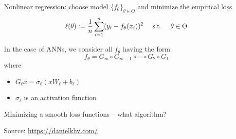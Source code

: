 \begin{frame}

    Nonlinear regression: choose model $\{f_\theta\}_{\theta \in \Theta}$ and minimize the empirical loss
    \begin{equation*}
        \ell(\theta) := \frac{1}{n}\sum_{i=1}^n (y_i - f_\theta(x_i))^2
        \quad \ \mathrm{s.t.}\  \quad \theta \in \Theta
    \end{equation*}


    \pause
    \vspace{0.5em}
    In the case of ANNs, we consider all $f_\theta$ having the form
    \begin{equation*}
        f_\theta
        = G_{m} \circ G_{m-1} \circ \cdots \circ G_{2}  \circ G_{1}
    \end{equation*}
    where
    \begin{itemize}
        \item $G_{\ell} x = \sigma_\ell(x W_\ell + b_\ell)$ 
        \vspace{0.5em}
        \item $\sigma_\ell$ is an activation function
    \end{itemize}

\end{frame}




\begin{frame}
    

    Minimizing a smooth loss functions  -- what algorithm?
    
    \begin{figure}
       \begin{center}
       \end{center}
    \end{figure}

    Source: \url{https://danielkhv.com/}

\end{frame}


